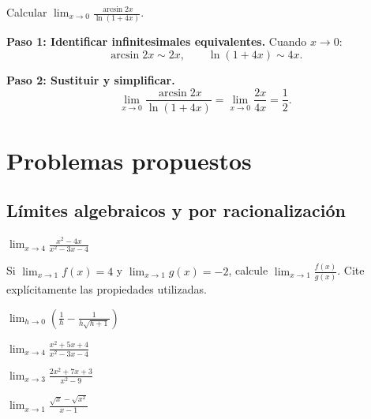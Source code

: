 \begin{example}
Calcular $\displaystyle\lim_{x\to 0}\frac{\arcsin 2x}{\ln(1+4x)}$.

\begin{myproof}
\textbf{Paso 1: Identificar infinitesimales equivalentes.} Cuando $x\to 0$:
\[
  \arcsin 2x\sim 2x, \qquad \ln(1+4x)\sim 4x.
\]

\textbf{Paso 2: Sustituir y simplificar.}
\[
  \lim_{x\to 0}\frac{\arcsin 2x}{\ln(1+4x)}
  = \lim_{x\to 0}\frac{2x}{4x} = \boxed{\dfrac{1}{2}.}
\]
\end{myproof}
\end{example}

\section{Problemas propuestos}

\subsection{Límites algebraicos y por racionalización}

\begin{prob}
$\displaystyle\lim_{x\to 4}\frac{x^2-4x}{x^2-3x-4}$
\end{prob}

\begin{prob}
Si $\lim_{x\to 1}f(x)=4$ y $\lim_{x\to 1}g(x)=-2$, calcule
$\lim_{x\to 1}\frac{f(x)}{g(x)}$. Cite explícitamente las propiedades
utilizadas.
\end{prob}

\begin{prob}
$\displaystyle\lim_{h\to 0}\!\left(\frac{1}{h}-\frac{1}{h\sqrt{h+1}}\right)$
\end{prob}

\begin{prob}
$\displaystyle\lim_{x\to 4}\frac{x^2+5x+4}{x^2-3x-4}$
\end{prob}

\begin{prob}
$\displaystyle\lim_{x\to 3}\frac{2x^2+7x+3}{x^2-9}$
\end{prob}

\begin{prob}
$\displaystyle\lim_{x\to 1}\frac{\sqrt{x}-\sqrt{x^2}}{x-1}$
\end{prob}

